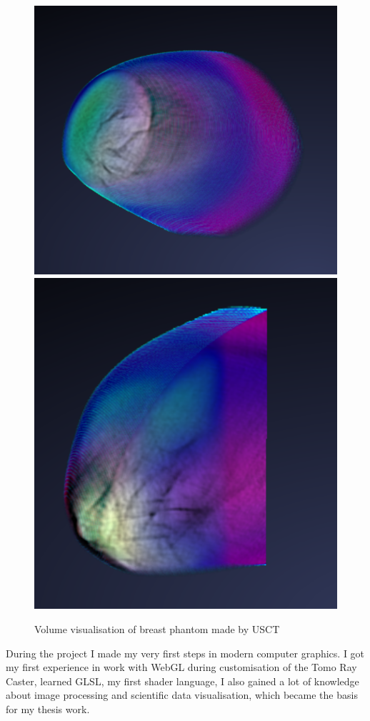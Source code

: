\documentclass[english, 11pt]{report}
\begin{document}
\begin{figure}[H]
\includegraphics[scale=0.4]{img/usct1}\includegraphics[scale=0.4335]{img/usct2}\\
\caption{Volume visualisation of breast phantom made by USCT}
\end{figure}

During the project I made my very first steps in modern computer graphics. I got my first experience in work with WebGL during customisation of the Tomo Ray Caster, learned GLSL, my first shader language, I also gained a lot of knowledge about image processing and scientific data visualisation, which became the basis for my thesis work.
\end{document}
